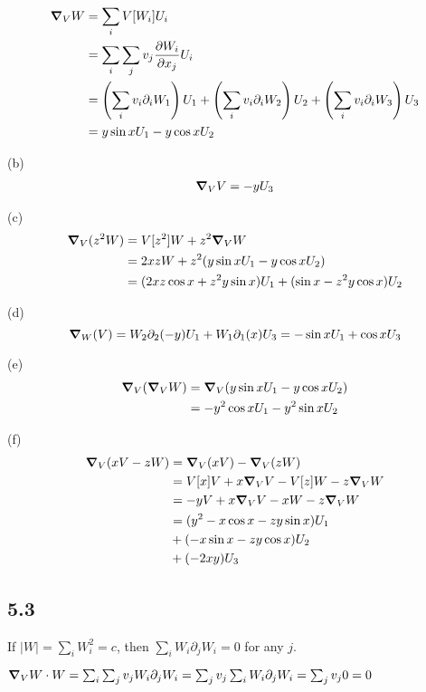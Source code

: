 \documentclass[12pt]{article}
\begin{document}
$$
\begin{aligned}
	\grad_V W &= \sum_i V[W_i]U_i \\ 
	&= \sum_i \sum_j v_j \frac{\partial W_i}{\partial x_j}U_i \\
	&= \left(\sum_i v_i \partial_i W_1\right) U_1  +  \left(\sum_i v_i \partial_i W_2\right) U_2  +  \left(\sum_i v_i \partial_i W_3\right) U_3 \\ 
	&= y\sin x U_1  - y\cos x U_2
\end{aligned} $$

(b) $$\begin{aligned}
	\grad_V V  = -y U_3
\end{aligned}$$

(c) $$\begin{aligned}
	\grad_V (z^2 W) &= V[z^2]W + z^2 \grad_V W \\
	 &= 2xzW + z^2(y\sin x U_1  - y\cos x U_2) \\
	 &= (2xz\cos x + z^2 y\sin x)U_1 + (\sin x - z^2y\cos x)U_2\\
\end{aligned} $$

(d) $$
	\grad_W(V) = W_2 \partial_2 (-y) U_1 + W_1 \partial_1(x) U_3 = -\sin x U_1 + \cos x U_3$$

(e) $$\begin{aligned}
	 \grad_V(\grad_V W) &= \grad_V(y\sin x U_1  - y\cos x U_2) \\
	 &=  -y^2 \cos x U_1   -y^2\sin xU_2
\end{aligned}$$	

(f) $$\begin{aligned}
	\grad_V(xV - zW) &= \grad_V(xV) - \grad_V(zW) \\
	&= V[x]V + x\grad_V V - V[z]W - z \grad_V W \\
	&= -yV + x \grad_V V - xW - z \grad_V W \\
	&= (y^2 - x\cos x - zy\sin x)U_1 \\
	&+ (- x\sin x - zy\cos x)U_2 \\
	&+ (-2xy)U_3
\end{aligned}$$
	
\subsection*{5.3}
If $|W|= \sum_i W_i^2 = c$, then $ \sum_i W_i \partial_jW_i = 0$ for any $j$.

$\grad_V W \cdot W = \sum_i \sum_j v_j  W_i \partial_j W_i = \sum_j v_j \sum_i  W_i \partial_j W_i = \sum_j v_j 0 = 0 $	
\QED
\end{document}

